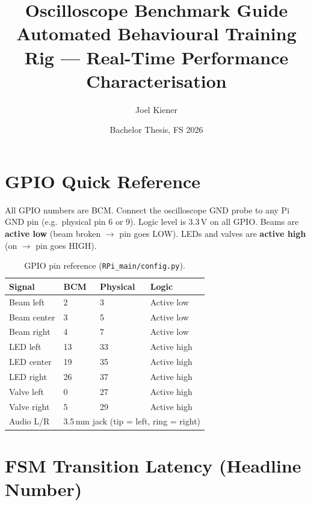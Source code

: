 \documentclass[11pt, a4paper]{article}
\title{\textbf{Oscilloscope Benchmark Guide}\\
\large Automated Behavioural Training Rig --- Real-Time Performance Characterisation}
\author{Joel Kiener}
\date{Bachelor Thesis, FS 2026}
\begin{document}
\maketitle

\tableofcontents
\newpage

\section*{GPIO Quick Reference}

All GPIO numbers are BCM. Connect the oscilloscope GND probe to any Pi GND
pin (e.g.\ physical pin 6 or 9). Logic level is 3.3\,V on all GPIO.
Beams are \textbf{active low} (beam broken $\rightarrow$ pin goes LOW).
LEDs and valves are \textbf{active high} (on $\rightarrow$ pin goes HIGH).

\begin{table}[h!]
\centering
\begin{tabular}{llll}
\toprule
\textbf{Signal} & \textbf{BCM} & \textbf{Physical} & \textbf{Logic} \\
\midrule
Beam left    & 2  & 3  & Active low  \\
Beam center  & 3  & 5  & Active low  \\
Beam right   & 4  & 7  & Active low  \\
LED left     & 13 & 33 & Active high \\
LED center   & 19 & 35 & Active high \\
LED right    & 26 & 37 & Active high \\
Valve left   & 0  & 27 & Active high \\
Valve right  & 5  & 29 & Active high \\
Audio L/R    & \multicolumn{3}{l}{3.5\,mm jack (tip = left, ring = right)} \\
\bottomrule
\end{tabular}
\caption{GPIO pin reference (\texttt{RPi\_main/config.py}).}
\end{table}

\newpage

\section{FSM Transition Latency (Headline Number)}
\end{document}
